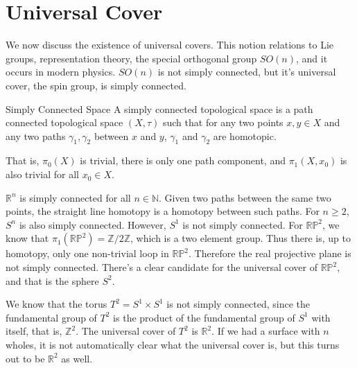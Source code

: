 \documentclass[crop=false,class=book,oneside]{standalone}
\begin{document}
    \section{Universal Cover}
        We now discuss the existence of universal covers.
        This notion relations to Lie groups, representation theory,
        the special orthogonal group $SO(n)$, and it occurs
        in modern physics. $SO(n)$ is not simply connected, but
        it's universal cover, the spin group, is simply
        connected.
        \begin{ldefinition}{Simply Connected Space}
            A simply connected topological space is a path
            connected topological space $(X,\tau)$ such that
            for any two points $x,y\in{X}$ and any two paths
            $\gamma_{1},\gamma_{2}$ between $x$ and $y$,
            $\gamma_{1}$ and $\gamma_{2}$ are homotopic.
        \end{ldefinition}
        That is, $\pi_{0}(X)$ is trivial, there is only one
        path component, and $\pi_{1}(X,x_{0})$ is also
        trivial for all $x_{0}\in{X}$.
        \begin{lexample}
            $\mathbb{R}^{n}$ is simply connected for all
            $n\in\mathbb{N}$. Given two paths between the same
            two points, the straight line homotopy is a homotopy
            between such paths. For $n\geq{2}$, $S^{n}$ is
            also simply connected. However, $S^{1}$ is not
            simply connected. For $\mathbb{RP}^{2}$, we know
            that $\pi_{1}(\mathbb{RP}^{2})=\mathbb{Z}/2\mathbb{Z}$,
            which is a two element group. Thus there is, up to
            homotopy, only one non-trivial loop in
            $\mathbb{RP}^{2}$. Therefore the real projective plane
            is not simply connected. There's a clear candidate for
            the universal cover of $\mathbb{RP}^{2}$, and that is
            the sphere $S^{2}$.
        \end{lexample}
        \begin{lexample}
            We know that the torus $T^{2}=S^{1}\times{S}^{1}$ is
            not simply connected, since the fundamental group of
            $T^{2}$ is the product of the fundamental group
            of $S^{1}$ with itself, that is, $\mathbb{Z}^{2}$. The
            universal cover of $T^{2}$ is $\mathbb{R}^{2}$. If
            we had a surface with $n$ wholes, it is not
            automatically clear what the universal cover is, but
            this turns out to be $\mathbb{R}^{2}$ as well.
        \end{lexample}
\end{document}
